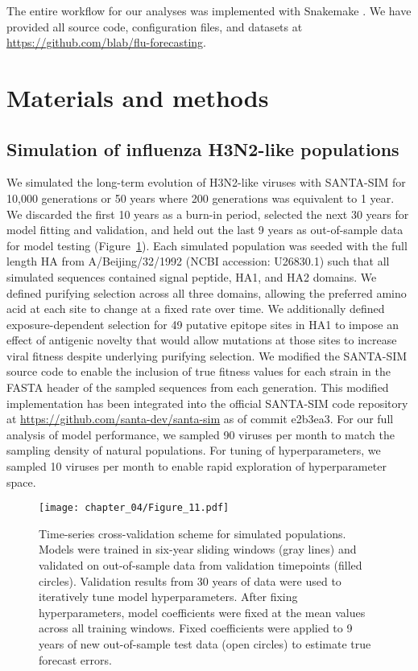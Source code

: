 The entire workflow for our analyses was implemented with Snakemake \citep{Snakemake}.
We have provided all source code, configuration files, and datasets at \href{https://github.com/blab/flu-forecasting}{https://github.com/blab/flu-forecasting}.

\section*{Materials and methods}

\subsection*{Simulation of influenza H3N2-like populations}

We simulated the long-term evolution of H3N2-like viruses with SANTA-SIM \citep{Jariani2019} for 10,000 generations or 50 years where 200 generations was equivalent to 1 year.
We discarded the first 10 years as a burn-in period, selected the next 30 years for model fitting and validation, and held out the last 9 years as out-of-sample data for model testing (Figure~\ref{fig:cross_validation_for_simulated_populations}).
Each simulated population was seeded with the full length HA from A/Beijing/32/1992 (NCBI accession: U26830.1) such that all simulated sequences contained signal peptide, HA1, and HA2 domains.
We defined purifying selection across all three domains, allowing the preferred amino acid at each site to change at a fixed rate over time.
We additionally defined exposure-dependent selection for 49 putative epitope sites in HA1 \citep{Luksza:2014hj} to impose an effect of antigenic novelty that would allow mutations at those sites to increase viral fitness despite underlying purifying selection.
We modified the SANTA-SIM source code to enable the inclusion of true fitness values for each strain in the FASTA header of the sampled sequences from each generation.
This modified implementation has been integrated into the official SANTA-SIM code repository at \url{https://github.com/santa-dev/santa-sim} as of commit e2b3ea3.
For our full analysis of model performance, we sampled 90 viruses per month to match the sampling density of natural populations.
For tuning of hyperparameters, we sampled 10 viruses per month to enable rapid exploration of hyperparameter space.

\begin{figure}
  \begin{center}
  \texttt{[image: chapter\_04/Figure\_11.pdf]}
  \caption{
  Time-series cross-validation scheme for simulated populations.
  Models were trained in six-year sliding windows (gray lines) and validated on out-of-sample data from validation timepoints (filled circles).
  Validation results from 30 years of data were used to iteratively tune model hyperparameters.
  After fixing hyperparameters, model coefficients were fixed at the mean values across all training windows.
  Fixed coefficients were applied to 9 years of new out-of-sample test data (open circles) to estimate true forecast errors.
  }
  \label{fig:cross_validation_for_simulated_populations}
  \end{center}
\end{figure}

